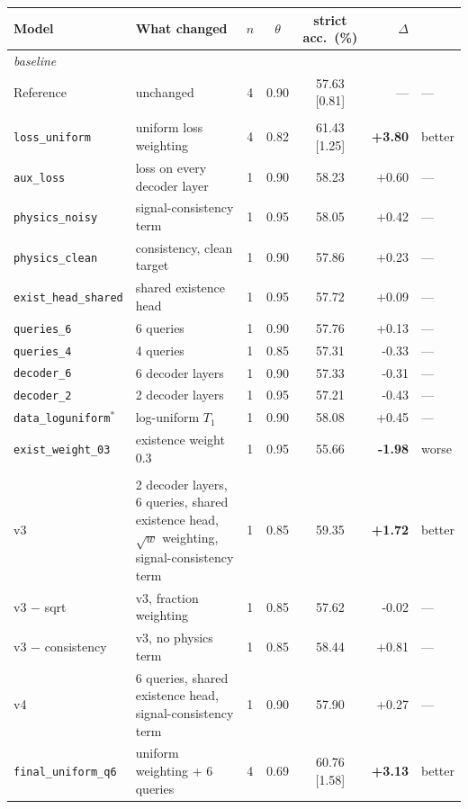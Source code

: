 \begin{tabular}{l p{4.3cm} cccrl}
\toprule
Model & What changed & $n$ & $\theta$ & strict acc.\ (\%) & $\Delta$ & \\
\midrule
\multicolumn{7}{l}{\emph{baseline}} \\
\quad Reference & unchanged & 4 & 0.90 & 57.63 {\scriptsize[0.81]} & --- & --- \\
\addlinespace
\multicolumn{7}{l}{\emph{one change}} \\
\quad \texttt{loss\_uniform} & uniform loss weighting & 4 & 0.82 & 61.43 {\scriptsize[1.25]} & \textbf{+3.80} & better \\
\quad \texttt{aux\_loss} & loss on every decoder layer & 1 & 0.90 & 58.23 & +0.60 & --- \\
\quad \texttt{physics\_noisy} & signal-consistency term & 1 & 0.95 & 58.05 & +0.42 & --- \\
\quad \texttt{physics\_clean} & consistency, clean target & 1 & 0.90 & 57.86 & +0.23 & --- \\
\quad \texttt{exist\_head\_shared} & shared existence head & 1 & 0.95 & 57.72 & +0.09 & --- \\
\quad \texttt{queries\_6} & 6 queries & 1 & 0.90 & 57.76 & +0.13 & --- \\
\quad \texttt{queries\_4} & 4 queries & 1 & 0.85 & 57.31 & -0.33 & --- \\
\quad \texttt{decoder\_6} & 6 decoder layers & 1 & 0.90 & 57.33 & -0.31 & --- \\
\quad \texttt{decoder\_2} & 2 decoder layers & 1 & 0.95 & 57.21 & -0.43 & --- \\
\quad \texttt{data\_loguniform}$^{*}$ & log-uniform $T_1$ & 1 & 0.90 & 58.08 & +0.45 & --- \\
\quad \texttt{exist\_weight\_03} & existence weight 0.3 & 1 & 0.95 & 55.66 & \textbf{-1.98} & worse \\
\addlinespace
\multicolumn{7}{l}{\emph{several changes}} \\
\quad v3 & 2 decoder layers, 6 queries, shared existence head, $\sqrt{w}$ weighting, signal-consistency term & 1 & 0.85 & 59.35 & \textbf{+1.72} & better \\
\quad v3 $-$ sqrt & v3, fraction weighting & 1 & 0.85 & 57.62 & -0.02 & --- \\
\quad v3 $-$ consistency & v3, no physics term & 1 & 0.85 & 58.44 & +0.81 & --- \\
\quad v4 & 6 queries, shared existence head, signal-consistency term & 1 & 0.90 & 57.90 & +0.27 & --- \\
\quad \texttt{final\_uniform\_q6} & uniform weighting + 6 queries & 4 & 0.69 & 60.76 {\scriptsize[1.58]} & \textbf{+3.13} & better \\
\bottomrule
\end{tabular}
